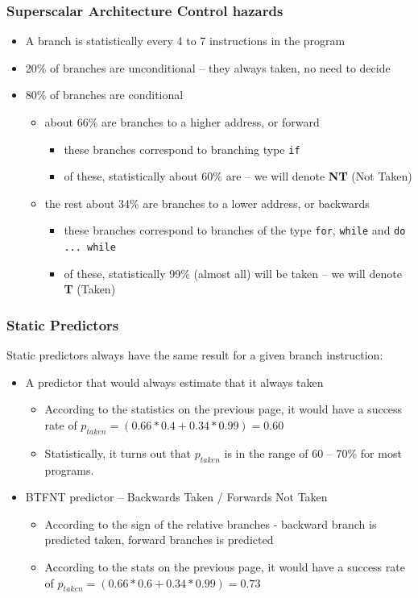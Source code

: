 \documentclass{beamer}
\begin{document}
\begin{frame}
\frametitle{Superscalar Architecture Control hazards}

\begin{itemize}
\item A branch is statistically every 4 to 7 instructions in the program
\item 20\% of branches are unconditional -- they always taken, no need to decide
\item 80\% of branches are conditional
  \begin{itemize}
  \item about 66\% are branches to a higher address, or forward
    \begin{itemize}
    \item these branches correspond to branching type \texttt{if}
    \item of these, statistically about 60\% are  -- we will denote \textbf{NT} (Not Taken)
    \end{itemize}
  \item the rest about 34\% are branches to a lower address, or backwards
    \begin{itemize}
    \item these branches correspond to branches of the type \texttt{for}, \texttt{while} and \texttt{do ... while}
    \item of these, statistically 99\% (almost all) will be taken -- we will denote \textbf{T} (Taken)
    \end{itemize}
  \end{itemize}
\end{itemize}

\end{frame}


\begin{frame}
\frametitle{Static Predictors}

Static predictors always have the same result for a given branch instruction:
\begin{itemize}
\item A predictor that would always estimate that it always taken
\begin{itemize}
\item According to the statistics on the previous page, it would have a success rate of $p_{taken} = (0.66*0.4+0.34*0.99) = 0.60$
\item Statistically, it turns out that $p_{taken}$ is in the range of 60 -- 70\% for most programs.
\end{itemize}
\item BTFNT predictor -- Backwards Taken / Forwards Not Taken
\begin{itemize}
\item According to the sign of the relative branches - backward branch is predicted taken, forward branches is predicted 
\item According to the stats on the previous page, it would have a success rate of $p_{taken} = (0.66*0.6+0.34*0.99) = 0.73$
\end{itemize}
\end{itemize}

\end{frame}
\end{document}
